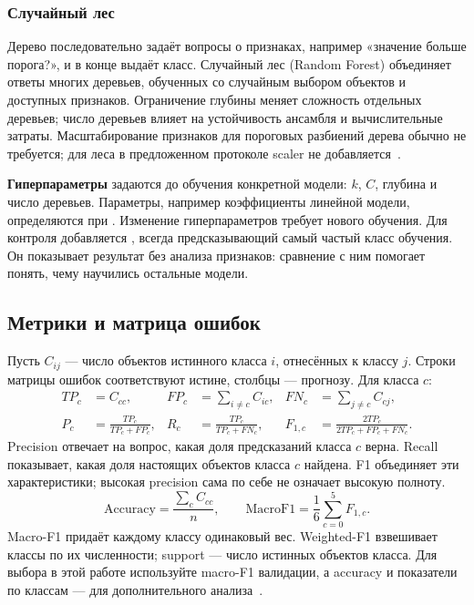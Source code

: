 \subsubsection*{Случайный лес}
Дерево последовательно задаёт вопросы о признаках, например «значение больше порога?», и в конце выдаёт класс. Случайный лес (Random Forest) объединяет ответы многих деревьев, обученных со случайным выбором объектов и доступных признаков. Ограничение глубины меняет сложность отдельных деревьев; число деревьев влияет на устойчивость ансамбля и вычислительные затраты. Масштабирование признаков для пороговых разбиений дерева обычно не требуется; для леса в предложенном протоколе scaler не добавляется~\cite{forest}.

\textbf{Гиперпараметры} задаются до обучения конкретной модели: \(k\), \(C\), глубина и число деревьев. Параметры, например коэффициенты линейной модели, определяются при . Изменение гиперпараметров требует нового обучения. Для контроля добавляется , всегда предсказывающий самый частый класс обучения. Он показывает результат без анализа признаков: сравнение с ним помогает понять, чему научились остальные модели.

\subsection{Метрики и матрица ошибок}
Пусть \(C_{ij}\) --- число объектов истинного класса \(i\), отнесённых к классу \(j\). Строки матрицы ошибок соответствуют истине, столбцы --- прогнозу. Для класса \(c\):
\begin{align}
TP_c&=C_{cc}, & FP_c&=\sum_{i\ne c}C_{ic}, & FN_c&=\sum_{j\ne c}C_{cj},\\
P_c&=\frac{TP_c}{TP_c+FP_c}, & R_c&=\frac{TP_c}{TP_c+FN_c}, &
F_{1,c}&=\frac{2TP_c}{2TP_c+FP_c+FN_c}.
\end{align}
Precision отвечает на вопрос, какая доля предсказаний класса \(c\) верна. Recall показывает, какая доля настоящих объектов класса \(c\) найдена. F1 объединяет эти характеристики; высокая precision сама по себе не означает высокую полноту.
\begin{equation}
\mathrm{Accuracy}=\frac{\sum_c C_{cc}}{n},\qquad
\mathrm{MacroF1}=\frac{1}{6}\sum_{c=0}^{5}F_{1,c}.
\end{equation}
Macro-F1 придаёт каждому классу одинаковый вес. Weighted-F1 взвешивает классы по их численности; support --- число истинных объектов класса. Для выбора в этой работе используйте macro-F1 валидации, а accuracy и показатели по классам --- для дополнительного анализа~\cite{classification}.

